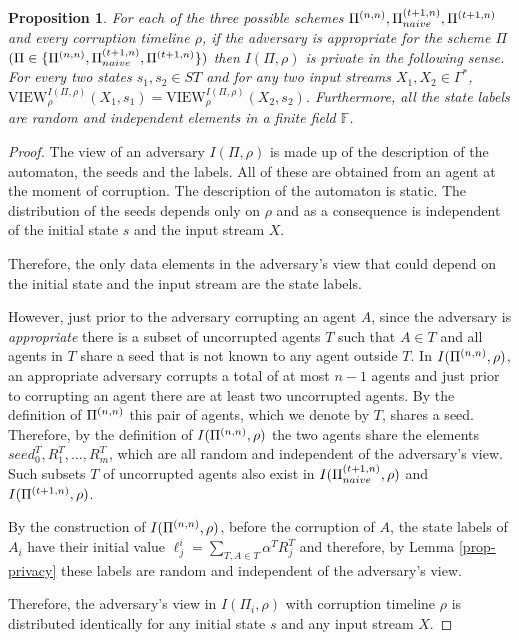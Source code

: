 \documentclass[letterpaper,11pt]{article}
\newcommand{\nnPi}{{\rm {\Pi}}^{(n,n)}}
\newcommand{\tnPiNaive}{{\rm {\Pi}}^{(t+1,n)}_{naive}}
\newcommand{\tnPi}{{\rm {\Pi}}^{(t+1,n)}}
\newtheorem{proposition}[theorem]{Proposition}
\begin{document}
\begin{proposition}
\label{prop:priv_intermediate}
For each of the three possible schemes $\nnPi, \tnPiNaive, \tnPi$ and every corruption timeline $\rho$, if the adversary is appropriate for the scheme $\Pi$ $(\Pi \in \{\nnPi, \tnPiNaive, \tnPi\})$ then $I(\Pi, \rho)$ is private in the following sense. For  every two states $s_1, s_2 \in ST$ and for any two input streams $X_1, X_2\in \Gamma^\ast$,
$\mbox{VIEW}_{\rho}^{I(\Pi,\rho)}(X_1, s_1)=\mbox{VIEW}_{\rho}^{I(\Pi,\rho)}(X_2, s_2)$. Furthermore, all the state labels are random and independent elements in a finite field $\mathbb{F}$.
\end{proposition}
\begin{proof}
The view of an adversary $I(\Pi, \rho)$ is made up of the description of the automaton, the seeds and the labels. All of these are obtained from an agent at the moment of corruption. The description of the automaton is static. The distribution of the seeds depends only on $\rho$ and as a consequence is independent of the initial state $s$ and the input stream $X$.

Therefore, the only data elements in the adversary's view that could depend on the initial state and the input stream are the state labels. 

However, just prior to the adversary corrupting an agent $A$, since the adversary is {\em appropriate} there is a subset of uncorrupted agents $T$ such that $A \in T$ and all agents in $T$ share a seed that is not known to any agent outside $T$. In $I(\nnPi, \rho)$, an appropriate adversary corrupts a total of at most $n-1$ agents and just prior to corrupting an agent there are at least two uncorrupted agents. By the definition of $\nnPi$ this pair of agents, which we denote by $T$, shares a seed. Therefore, by the definition of $I(\nnPi, \rho)$ the two agents share the elements $seed^T_0, R^T_1,\ldots,R^T_m$, which are all random and independent of the adversary's view. Such subsets $T$ of uncorrupted agents also exist in $I(\tnPiNaive, \rho)$ and $I(\tnPi, \rho)$. 

By the construction of $I(\nnPi, \rho)$, before the corruption of $A$, the state labels of $A_i$ have their initial value $\ell^i_j = \sum_{T, A \in T} \alpha^T R^T_j$ and therefore, by Lemma \ref{prop-privacy} these labels are random and independent of the adversary's view.

Therefore, the adversary's view in $I(\Pi_i, \rho)$ with corruption timeline $\rho$ is distributed identically for any initial state $s$ and any input stream $X$.
\end{proof}
\end{document}
